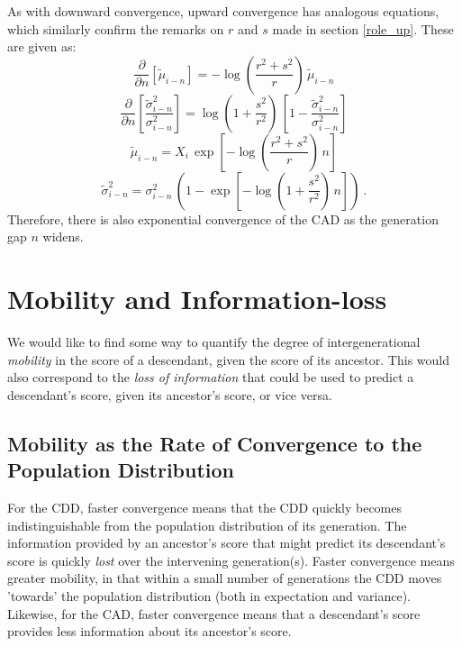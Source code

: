 \documentclass{svproc} %
\begin{document}
As with downward convergence, upward convergence has analogous equations, which similarly confirm the remarks on $r$ and $s$ made in section \ref{role_up}. These are given as:
\begin{equation}
\frac{\partial}{\partial n}[\tilde{\mu}_{i-n}] = -\log(\frac{r^2 + s^2}{r}) \, \tilde{\mu}_{i-n} 
\label{eq:partial_a_mean}
\end{equation}
%
\begin{equation}
\frac{\partial }{\partial n}[\frac{\tilde{\sigma}_{i-n}^2}{\sigma_{i-n}^2}] = \log(1+\frac{s^2}{r^2}) \, [1 - \frac{\tilde{\sigma}_{i-n}^2}{\sigma_{i-n}^2}] 
\label{eq:partial_a_var}
\end{equation}
%
\begin{equation}
\tilde{\mu}_{i-n} = X_i \, \exp[-\log(\frac{r^2 + s^2}{r}) \, n] 
\label{eq:expo_a_mean}
\end{equation}
%
\begin{equation}
\tilde{\sigma}_{i-n}^2 = \sigma_{i-n}^2 \, (1 - \exp[-\log(1+\frac{s^2}{r^2}) \, n]) \ .
\label{eq:expo_a_var}
\end{equation}
Therefore, there is also exponential convergence of the CAD as the generation gap $n$ widens. 



\section{Mobility and Information-loss}

We would like to find some way to quantify the degree of intergenerational \emph{mobility} in the score of a descendant, given the score of its ancestor. This would also correspond to the \emph{loss of information} that could be used to predict a descendant's score, given its ancestor's score, or vice versa.

\subsection{Mobility as the Rate of Convergence to the Population Distribution}
For the CDD, faster convergence means that the CDD quickly becomes indistinguishable from the population distribution of its generation. The information provided by an ancestor's score that might predict its descendant's score is quickly \emph{lost} over the intervening generation(s). Faster convergence means greater mobility, in that within a small number of generations the CDD moves 'towards' the population distribution (both in expectation and variance). Likewise, for the CAD, faster convergence means that a descendant's score provides less information about its ancestor's score. 
\end{document}
